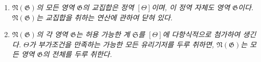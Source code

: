 
\begin{enumerate}
\item[a)] \emph{$\mathfrak N(\mathfrak G)$의 모든 영역 $\mathfrak G$의 교집합은 정역 $[\Theta]$이며, 이 정역 자체도 영역 $\mathfrak G$이다. $\mathfrak N(\mathfrak G)$는 교집합을 취하는 연산에 관하여 닫혀 있다.}
\item[b)] \emph{$\mathfrak N(\mathfrak G)$의 각 영역 $\mathfrak G$는 허용 가능한 계 $\mathfrak S$를 $[\Theta]$에 다항식적으로 첨가하여 생긴다. $\Theta$가 부가조건을 만족하는 가능한 모든 유리기저를 두루 취하면, $\mathfrak N(\mathfrak G)$는 모든 영역 $\mathfrak G$의 전체를 두루 취한다.}
\end{enumerate}
